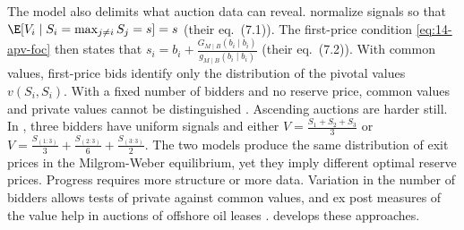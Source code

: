  The model also delimits what auction data can reveal.
\citet[Section~7]{AtheyHaile2007} normalize signals so that $\E[V_i\mid S_i=\max_{j\ne i}S_j=s]=s$ (their
eq.~(7.1)). The first-price condition \eqref{eq:14-apv-foc} then states that $s_i=b_i+\frac{G_{M\mid B}(b_i\mid
b_i)}{g_{M\mid B}(b_i\mid b_i)}$ (their eq.~(7.2)). With common values, first-price bids identify only the
distribution of the pivotal values $v(S_i,S_i)$. With a fixed number of bidders and no reserve price, common
values and private values cannot be distinguished \citep{LaffontVuong1996,GuerrePerrigneVuong2000}. Ascending
auctions are harder still. In \citet[Theorem~7.1]{AtheyHaile2007}, three bidders have uniform signals and
either $V=\frac{S_1+S_2+S_3}{3}$ or $V=\frac{S_{(1:3)}}{3}+\frac{S_{(2:3)}}{6}+\frac{S_{(3:3)}}{2}$. The two
models produce the same distribution of exit prices in the Milgrom-Weber equilibrium, yet they imply different
optimal reserve prices. Progress requires more structure or more data. Variation in the number of bidders
allows tests of private against common values, and ex post measures of the value help in auctions of offshore
oil leases \citep{HendricksPorter1988,HendricksPinksePorter2003}.  develops these
approaches.
